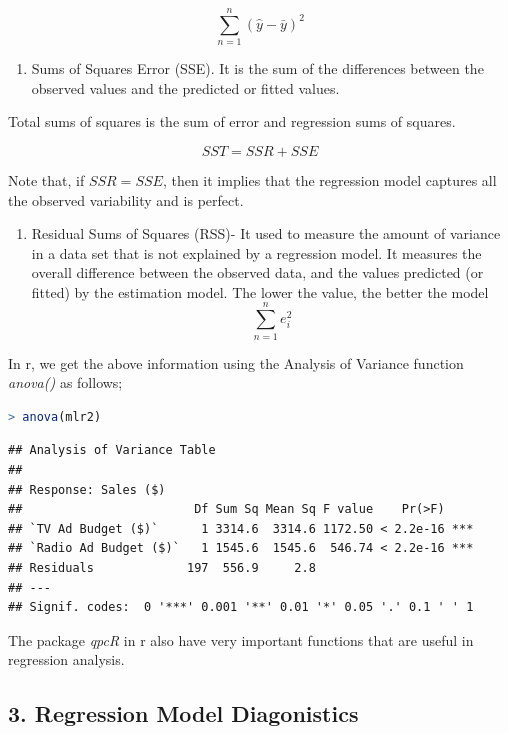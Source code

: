 \documentclass[
]{article}
\providecommand{\tightlist}{%
  \setlength{\itemsep}{0pt}\setlength{\parskip}{0pt}}
\begin{document}
\[\sum_{n=1}^n(\hat{y}-\bar{y})^2\]

\begin{enumerate}
\def\labelenumi{\arabic{enumi}.}
\setcounter{enumi}{1}
\tightlist
\item
  Sums of Squares Error (SSE). It is the sum of the differences between
  the observed values and the predicted or fitted values.
\end{enumerate}

Total sums of squares is the sum of error and regression sums of
squares.

\[SST=SSR+SSE \]

Note that, if \(SSR=SSE\), then it implies that the regression model
captures all the observed variability and is perfect.

\begin{enumerate}
\def\labelenumi{\arabic{enumi}.}
\setcounter{enumi}{2}
\tightlist
\item
  Residual Sums of Squares (RSS)- It used to measure the amount of
  variance in a data set that is not explained by a regression model. It
  measures the overall difference between the observed data, and the
  values predicted (or fitted) by the estimation model. The lower the
  value, the better the model \[\sum_{n=1}^ne_i^2\]
\end{enumerate}

In r, we get the above information using the Analysis of Variance
function \emph{anova()} as follows;

\begin{lstlisting}[language=R]
> anova(mlr2)
\end{lstlisting}

\begin{lstlisting}
## Analysis of Variance Table
## 
## Response: Sales ($)
##                        Df Sum Sq Mean Sq F value    Pr(>F)    
## `TV Ad Budget ($)`      1 3314.6  3314.6 1172.50 < 2.2e-16 ***
## `Radio Ad Budget ($)`   1 1545.6  1545.6  546.74 < 2.2e-16 ***
## Residuals             197  556.9     2.8                      
## ---
## Signif. codes:  0 '***' 0.001 '**' 0.01 '*' 0.05 '.' 0.1 ' ' 1
\end{lstlisting}

The package \emph{qpcR} in r also have very important functions that are
useful in regression analysis.

\hypertarget{regression-model-diagonistics}{%
\subsection{3. Regression Model
Diagonistics}\label{regression-model-diagonistics}}
\end{document}
